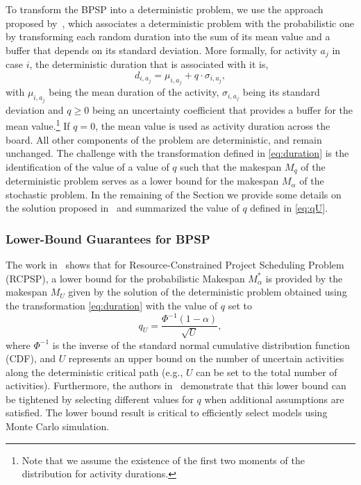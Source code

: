 To transform the BPSP into a deterministic problem, we use the approach proposed by~\cite{beck2007proactive}, which associates a deterministic problem with the probabilistic one by transforming each random duration into the sum of its mean value and a buffer that depends on its standard deviation. More formally, for activity $a_j$ in case $i$, the deterministic duration
that is associated with it is, \begin{equation}
d_{i,a_j} = \mu_{i, a_j} + q \cdot \sigma_{i, a_j},\label{eq:duration}
\end{equation} with 
$\mu_{i, a_j}$ being the mean duration
of the activity, $\sigma_{i, a_j}$ being its standard deviation
and $q\geq0$ being
an uncertainty coefficient that provides a buffer for the mean value.\footnote{Note that we assume the existence of the first two moments of the distribution for activity durations.}
If $q=0$, the mean value is used as activity duration across the board.
All other components of the problem are deterministic, 
and remain unchanged. 
The challenge with the transformation defined in \eqref{eq:duration} is the identification of the value of a value of $q$ such that the makespan $M_q$ of the deterministic problem serves as a lower bound for the makespan $M_\alpha$ of the stochastic problem. In the remaining of the Section we provide some details on the solution proposed in~\cite{beck2007proactive} and summarized the value of $q$ defined in \eqref{eq:qU}.


\subsubsection{Lower-Bound Guarantees for BPSP} 


The work in~\cite{beck2007proactive} shows that for Resource-Constrained Project Scheduling Problem (RCPSP),
a lower bound for the probabilistic Makespan $M^*_\alpha$ is provided by the makespan $M_U$ given by the solution of the deterministic problem obtained using the transformation \eqref{eq:duration} with the value of  $q$ set to
\begin{equation}
q_U = \frac{\Phi^{-1}(1-\alpha)}{\sqrt{U}},
\label{eq:qU}
\end{equation}
where $\Phi^{-1}$ is the inverse of the standard normal cumulative distribution function (CDF), and $U$ represents an upper bound on the number of uncertain activities along the deterministic critical path (e.g., $U$ can be set to the total number of activities).
Furthermore, the authors in~\cite{beck2007proactive} demonstrate that this lower bound can be tightened by selecting different values for \( q \) when additional assumptions are satisfied. The lower bound result is critical to efficiently select models using Monte Carlo simulation.


